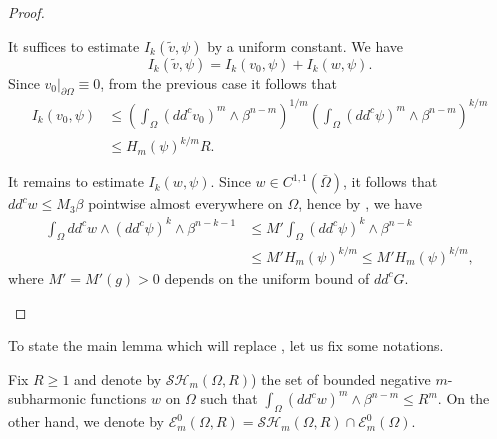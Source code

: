 \begin{proof}
\begin{enumerate}
It suffices to estimate $ I_k (\tilde v,\psi) $ by a uniform constant. We have
\[
I_k (\tilde v,\psi) = I_k (v_0, \psi) + I_k (w,\psi).
\]
Since $v_0|_{\partial \Omega} \equiv 0$, from the previous case it follows that
\begin{align*}
I_k (v_0,\psi) & \leq  \left(\int_\Omega (dd^c v_0)^m \wedge \beta^{n-m}\right)^{1 \slash m} \left(\int_\Omega (dd^c \psi)^m \wedge \beta^{n-m}\right)^{k \slash m} \\
&\leq  H_m (\psi)^{k\slash m} R.
\end{align*}

It remains to estimate $ I_k (w,\psi)$.
Since $w \in C^{1,1} (\bar{\Omega})$, it follows that $dd^c w \leq M_3 \beta$ pointwise almost everywhere on $\Omega$, hence by \cite[Lem.\,2.8]{BZ20} , we have
\begin{align*}
\int_\Omega dd^c w \wedge (dd^c \psi)^k \wedge \beta^{n-k-1} &\leq  M' \int_\Omega (dd^c \psi) ^k \wedge \beta^{n-k} \\
& \leq  M' H_m (\psi)^{k\slash m} \leq M' H_m (\psi)^{k\slash m},
\end{align*}
where $M' = M'(g) > 0$ depends on the uniform bound of $dd^c G$.\qedhere
\end{enumerate}
\end{proof}

To state the main lemma which will replace \cite[Lem.\,4.2]{BZ20}, let us fix some notations.

Fix $R \geq 1$ and denote by $\mathcal{SH}_m (\Omega,R)$) the set of bounded negative $m$-subharmonic functions $w$ on $\Omega$ such that $\int_\Omega (dd^c w)^m \wedge \beta^{n-m} \leq R^m$.
On the other hand, we denote by $ \mathcal{E}_m^0 (\Omega,R) = \mathcal{SH}_m (\Omega,R) \cap \mathcal{E}^0_m (\Omega)$.

